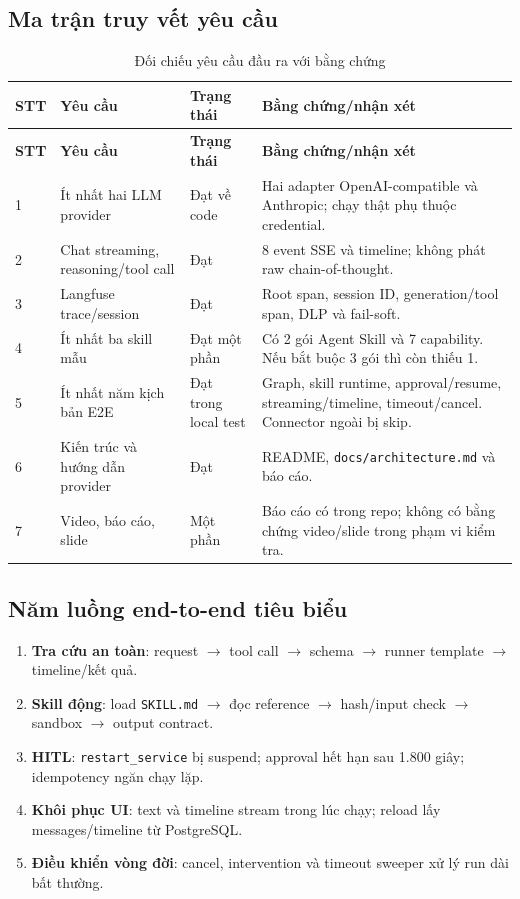 \documentclass[12pt,a4paper]{article}
\begin{document}
\subsection{Ma trận truy vết yêu cầu}
\begin{longtable}{p{}p{}p{}p{}}
\caption{Đối chiếu yêu cầu đầu ra với bằng chứng}\label{tab:traceability}\\
\toprule
\textbf{STT} & \textbf{Yêu cầu} & \textbf{Trạng thái} & \textbf{Bằng chứng/nhận xét} \\
\midrule
\endfirsthead
\toprule
\textbf{STT} & \textbf{Yêu cầu} & \textbf{Trạng thái} & \textbf{Bằng chứng/nhận xét} \\
\midrule
\endhead
1 & Ít nhất hai LLM provider & Đạt về code & Hai adapter OpenAI-compatible và Anthropic; chạy thật phụ thuộc credential. \\
2 & Chat streaming, reasoning/tool call & Đạt & 8 event SSE và timeline; không phát raw chain-of-thought. \\
3 & Langfuse trace/session & Đạt & Root span, session ID, generation/tool span, DLP và fail-soft. \\
4 & Ít nhất ba skill mẫu & Đạt một phần & Có 2 gói Agent Skill và 7 capability. Nếu bắt buộc 3 gói thì còn thiếu 1. \\
5 & Ít nhất năm kịch bản E2E & Đạt trong local test & Graph, skill runtime, approval/resume, streaming/timeline, timeout/cancel. Connector ngoài bị skip. \\
6 & Kiến trúc và hướng dẫn provider & Đạt & README, \texttt{docs/architecture.md} và báo cáo. \\
7 & Video, báo cáo, slide & Một phần & Báo cáo có trong repo; không có bằng chứng video/slide trong phạm vi kiểm tra. \\
\bottomrule
\end{longtable}

\subsection{Năm luồng end-to-end tiêu biểu}
\begin{enumerate}
  \item \textbf{Tra cứu an toàn}: request $\rightarrow$ tool call $\rightarrow$ schema $\rightarrow$ runner template $\rightarrow$ timeline/kết quả.
  \item \textbf{Skill động}: load \texttt{SKILL.md} $\rightarrow$ đọc reference $\rightarrow$ hash/input check $\rightarrow$ sandbox $\rightarrow$ output contract.
  \item \textbf{HITL}: \texttt{restart\_service} bị suspend; approval hết hạn sau 1.800 giây; idempotency ngăn chạy lặp.
  \item \textbf{Khôi phục UI}: text và timeline stream trong lúc chạy; reload lấy messages/timeline từ PostgreSQL.
  \item \textbf{Điều khiển vòng đời}: cancel, intervention và timeout sweeper xử lý run dài bất thường.
\end{enumerate}
\end{document}
